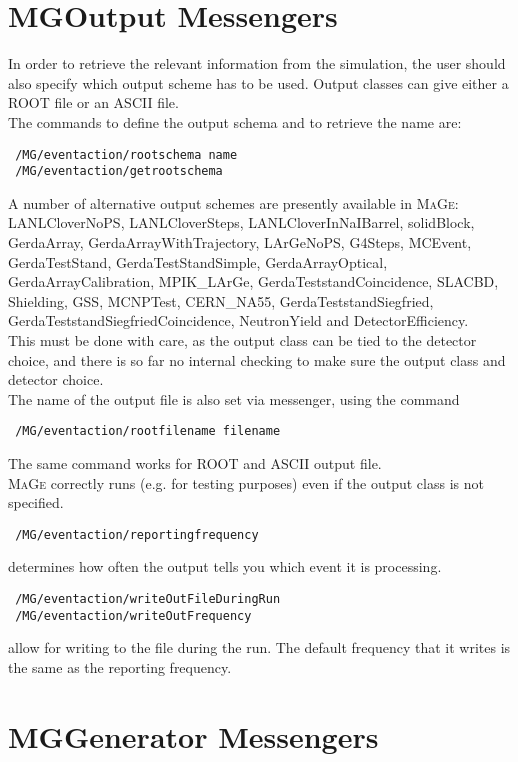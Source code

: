 \section{MGOutput Messengers}
In order to retrieve the relevant information from the simulation, the user should also 
specify which output scheme has to be used. Output classes can give either a ROOT file 
or an ASCII file.\\
The commands to define the output schema and to retrieve the name are:
\begin{lstlisting}
 /MG/eventaction/rootschema name
 /MG/eventaction/getrootschema
\end{lstlisting}
A number of alternative output schemes are presently available in \textsc{MaGe}: LANLCloverNoPS, 
LANLCloverSteps, LANLCloverInNaIBarrel, solidBlock, GerdaArray,
GerdaArrayWithTrajectory, LArGeNoPS, G4Steps, MCEvent, 
GerdaTestStand, GerdaTestStandSimple, GerdaArrayOptical, GerdaArrayCalibration, 
MPIK\_LArGe, GerdaTeststandCoincidence, SLACBD, Shielding, GSS, MCNPTest, 
CERN\_NA55, GerdaTeststandSiegfried, GerdaTeststandSiegfriedCoincidence, 
NeutronYield and DetectorEfficiency. \\
This must be done with care, as the output class can be tied to the detector choice, and 
there is so far no internal checking to make sure the output class and detector choice.\\
The name of the output file is also set via messenger, using the command
\begin{lstlisting}
 /MG/eventaction/rootfilename filename
\end{lstlisting}
The same command works for ROOT and ASCII output file. \\
\textsc{MaGe} correctly runs (e.g. for testing purposes) even if the output class is 
not specified.

\begin{lstlisting}
 /MG/eventaction/reportingfrequency
\end{lstlisting}
determines how often the output tells you which event it is processing.

\begin{lstlisting}
 /MG/eventaction/writeOutFileDuringRun
 /MG/eventaction/writeOutFrequency
\end{lstlisting}
allow for writing to the file during the run.  The default frequency that it
writes is the same as the reporting frequency.


\section{MGGenerator Messengers}

